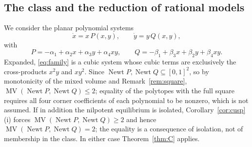 \documentclass[12pt]{article}
\theoremstyle{plain}
\theoremstyle{definition}
\theoremstyle{remark}
\DeclareMathOperator{\MV}{MV}
\DeclareMathOperator{\Newt}{Newt}
\begin{document}
	\subsection{The class and the reduction of rational models}
	
	We consider the planar polynomial systems
	\begin{equation}\label{eq:family}
		\dot x = x\,P(x,y),\qquad
		\dot y = y\,Q(x,y),
	\end{equation}
	with
	\begin{equation}\label{eq:PQ}
		P = -\alpha_{1}+\alpha_{2}x+\alpha_{3}y+\alpha_{4}xy,
		\qquad
		Q = -\beta_{1}+\beta_{3}x+\beta_{2}y+\beta_{4}xy .
	\end{equation}
	Expanded, \eqref{eq:family} is a cubic system whose cubic terms are
	exclusively the cross-products $x^{2}y$ and $xy^{2}$.  Since
	$\Newt P,\Newt Q\subseteq[0,1]^{2}$, so by monotonicity of the mixed
	volume and Remark~\ref{rem:square},
	$\MV(\Newt P,\Newt Q)\le2$; equality of the polytopes with the full
	square requires all four corner coefficients of each polynomial to be
	nonzero, which is not assumed.  If in addition the nilpotent
	equilibrium is isolated, Corollary~\ref{cor:cusp}(i) forces
	$\MV(\Newt P,\Newt Q)\ge2$ and hence $\MV(\Newt P,\Newt Q)=2$; the
	equality is a consequence of isolation, not of membership in the class.
	In either case Theorem~\ref{thm:C} applies.
	
\end{document}
